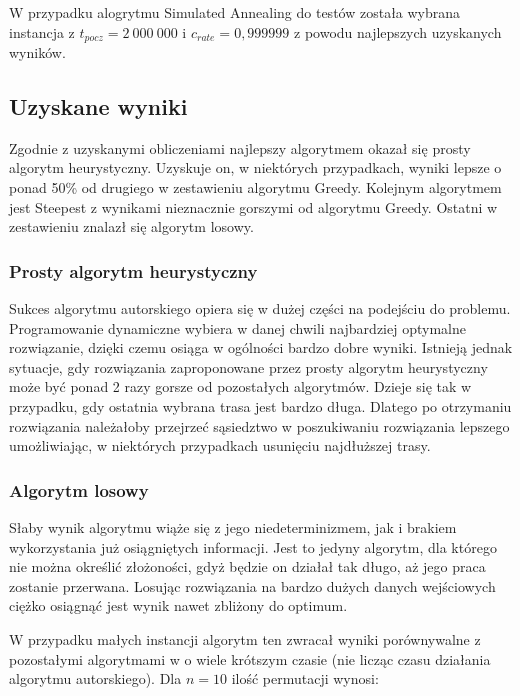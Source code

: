 W przypadku alogrytmu Simulated Annealing do testów została wybrana instancja z
$ t_{pocz} = 2~000~000 $ i $ c_{rate} = 0,999999 $ z powodu najlepszych uzyskanych wyników.

\subsection{Uzyskane wyniki}
                                                                       
Zgodnie z uzyskanymi obliczeniami najlepszy algorytmem okazał się prosty algorytm 
heurystyczny. Uzyskuje on, w niektórych przypadkach, wyniki lepsze o ponad 50\% od
drugiego w zestawieniu algorytmu Greedy. Kolejnym algorytmem jest Steepest z wynikami 
nieznacznie gorszymi od algorytmu Greedy. Ostatni w zestawieniu znalazł się algorytm 
losowy.

\subsubsection{Prosty algorytm heurystyczny}

Sukces algorytmu autorskiego opiera się w dużej części na podejściu do problemu. 
Programowanie dynamiczne wybiera w danej chwili najbardziej optymalne rozwiązanie, 
dzięki czemu osiąga w ogólności bardzo dobre wyniki. Istnieją jednak sytuacje, gdy 
rozwiązania zaproponowane przez prosty algorytm heurystyczny może być ponad 2 razy 
gorsze od pozostałych algorytmów. Dzieje się tak w przypadku, gdy ostatnia wybrana 
trasa jest bardzo długa. Dlatego po otrzymaniu rozwiązania należałoby przejrzeć 
sąsiedztwo w poszukiwaniu rozwiązania lepszego umożliwiając, w niektórych przypadkach
usunięciu najdłuższej trasy.

\subsubsection{Algorytm losowy}

Słaby wynik algorytmu wiąże się z jego niedeterminizmem, jak i brakiem wykorzystania 
już osiągniętych informacji. Jest to jedyny algorytm, dla którego nie można określić 
złożoności, gdyż będzie on działał tak długo, aż jego praca zostanie przerwana. Losując 
rozwiązania na bardzo dużych danych wejściowych ciężko osiągnąć jest wynik nawet zbliżony 
do optimum. 

W przypadku małych instancji algorytm ten zwracał wyniki porównywalne z 
pozostałymi algorytmami w o wiele krótszym czasie (nie licząc czasu działania algorytmu
autorskiego). Dla $ n = 10 $ ilość permutacji wynosi:

